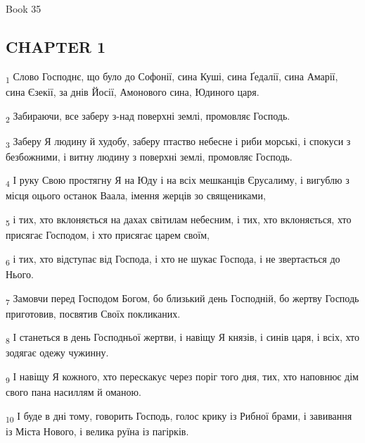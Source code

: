 Book 35
\subsection{CHAPTER 1}
\begin{tcolorbox}
\textsubscript{1} Слово Господнє, що було до Софонії, сина Куші, сина Ґедалії, сина Амарії, сина Єзекії, за днів Йосії, Амонового сина, Юдиного царя.
\end{tcolorbox}
\begin{tcolorbox}
\textsubscript{2} Забираючи, все заберу з-над поверхні землі, промовляє Господь.
\end{tcolorbox}
\begin{tcolorbox}
\textsubscript{3} Заберу Я людину й худобу, заберу птаство небесне і риби морські, і спокуси з безбожними, і витну людину з поверхні землі, промовляє Господь.
\end{tcolorbox}
\begin{tcolorbox}
\textsubscript{4} І руку Свою простягну Я на Юду і на всіх мешканців Єрусалиму, і вигублю з місця оцього останок Ваала, імення жерців зо священиками,
\end{tcolorbox}
\begin{tcolorbox}
\textsubscript{5} і тих, хто вклоняється на дахах світилам небесним, і тих, хто вклоняється, хто присягає Господом, і хто присягає царем своїм,
\end{tcolorbox}
\begin{tcolorbox}
\textsubscript{6} і тих, хто відступає від Господа, і хто не шукає Господа, і не звертається до Нього.
\end{tcolorbox}
\begin{tcolorbox}
\textsubscript{7} Замовчи перед Господом Богом, бо близький день Господній, бо жертву Господь приготовив, посвятив Своїх покликаних.
\end{tcolorbox}
\begin{tcolorbox}
\textsubscript{8} І станеться в день Господньої жертви, і навіщу Я князів, і синів царя, і всіх, хто зодягає одежу чужинну.
\end{tcolorbox}
\begin{tcolorbox}
\textsubscript{9} І навіщу Я кожного, хто перескакує через поріг того дня, тих, хто наповнює дім свого пана насиллям й оманою.
\end{tcolorbox}
\begin{tcolorbox}
\textsubscript{10} І буде в дні тому, говорить Господь, голос крику із Рибної брами, і завивання із Міста Нового, і велика руїна із пагірків.
\end{tcolorbox}
